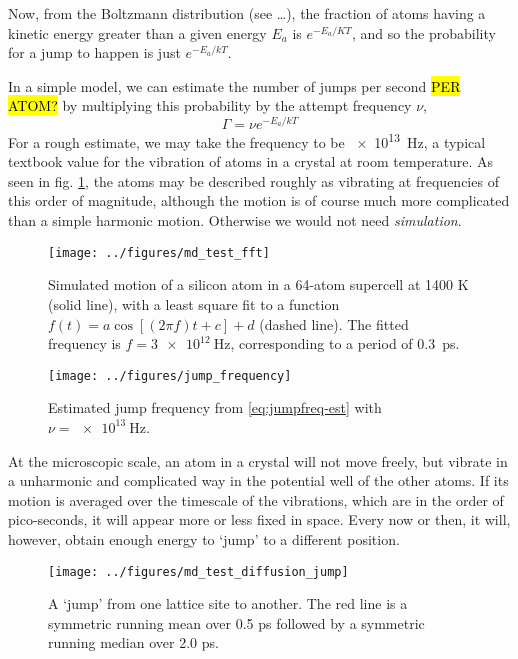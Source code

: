 \documentclass[11pt,bibliography=totoc,index=totoc]{scrbook}   %
\newcommand{\comment}[1]{\hl{#1}}
\begin{document}
Now, from the Boltzmann distribution (see \ldots), the fraction of atoms having a kinetic energy greater than a given energy $E_a$ is $e^{-E_a/KT}$, and so the probability for a jump to happen is just $e^{-E_a/kT}$. 

In a simple model, we can estimate the number of jumps per second \comment{PER ATOM?} by multiplying this probability by the attempt frequency $\nu$,
\begin{equation}
  \Gamma = \nu e^{-E_a/kT}
  \label{eq:jumpfreq-est}
\end{equation}
For a rough estimate, we may take the frequency to be \SI{e13}{\hertz}, a typical textbook value for the vibration of atoms in a crystal at room temperature.
As seen in fig. \ref{fig:simple-vibration}, the atoms may be described roughly as vibrating at frequencies of this order of magnitude, although the motion is of course much more complicated than a simple harmonic motion. Otherwise we would not need \emph{simulation}.

\begin{figure}[htbp]
  \begin{center}
    \texttt{[image: ../figures/md\_test\_fft]}
  \end{center}
  \caption{
    Simulated motion of a silicon atom in a 64-atom supercell at 1400 K (solid line), 
    with a least square fit to a function $f(t) = a \cos[(2\pi f)t + c] + d$ (dashed line). 
    The fitted frequency is $f=\SI{3e12}{\hertz}$, corresponding to a period of 0.3~ps.
  }
  \label{fig:simple-vibration}
\end{figure}

\begin{figure}[htbp]
  \begin{center}
    \texttt{[image: ../figures/jump\_frequency]}
  \end{center}
  \caption{Estimated jump frequency from \eqref{eq:jumpfreq-est} with $\nu=\SI{e13}{\hertz}$.}
  \label{fig:jumpfreq-est}
\end{figure}




At the microscopic scale, an atom in a crystal will not move freely, but vibrate in a unharmonic and complicated way in the potential well of the other atoms. 
If its motion is averaged over the timescale of the vibrations, which are in the order of pico-seconds, it will appear more or less fixed in space. 
Every now or then, it will, however, obtain enough energy to `jump' to a different position.

\begin{figure}[htbp]
  \begin{center}
    \texttt{[image: ../figures/md\_test\_diffusion\_jump]}
  \end{center}
  \caption{A `jump' from one lattice site to another. The red line is a symmetric running mean over 0.5 ps followed by a symmetric running median over 2.0 ps.}
  \label{fig:../figures/md_test_diffusion_jump}
\end{figure}
\end{document}
